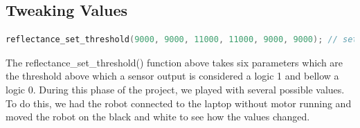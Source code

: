\documentclass[11pt,a4paper,oneside,article]{memoir}
\begin{document}
\subsection{Tweaking Values}
\vspace{-22pt}\begin{lstlisting}[language=C,caption={Reflectance Threshold},label=refthres.c] 
reflectance_set_threshold(9000, 9000, 11000, 11000, 9000, 9000); // set center sensor threshold to 11000 and others to 9000
\end{lstlisting}\vspace{-22pt}
The reflectance\_set\_threshold() function above takes six parameters which are the threshold above which a sensor output is considered a logic 1 and bellow a logic 0. During this phase of the project, we played with several possible values. To do this, we had the robot connected to the laptop without motor running and moved the robot on the black and white to see how the values changed. 
\end{document}
